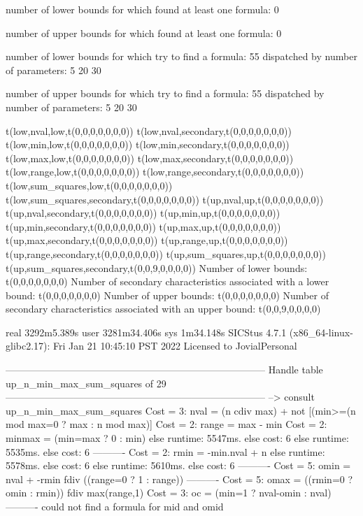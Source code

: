number of lower bounds for which found at least one formula: 0

number of upper bounds for which found at least one formula: 0

number of lower bounds for which try to find a formula: 55
dispatched by number of parameters: 5  20  30

number of upper bounds for which try to find a formula: 55
dispatched by number of parameters: 5  20  30

t(low,nval,low,t(0,0,0,0,0,0,0))
t(low,nval,secondary,t(0,0,0,0,0,0,0))
t(low,min,low,t(0,0,0,0,0,0,0))
t(low,min,secondary,t(0,0,0,0,0,0,0))
t(low,max,low,t(0,0,0,0,0,0,0))
t(low,max,secondary,t(0,0,0,0,0,0,0))
t(low,range,low,t(0,0,0,0,0,0,0))
t(low,range,secondary,t(0,0,0,0,0,0,0))
t(low,sum_squares,low,t(0,0,0,0,0,0,0))
t(low,sum_squares,secondary,t(0,0,0,0,0,0,0))
t(up,nval,up,t(0,0,0,0,0,0,0))
t(up,nval,secondary,t(0,0,0,0,0,0,0))
t(up,min,up,t(0,0,0,0,0,0,0))
t(up,min,secondary,t(0,0,0,0,0,0,0))
t(up,max,up,t(0,0,0,0,0,0,0))
t(up,max,secondary,t(0,0,0,0,0,0,0))
t(up,range,up,t(0,0,0,0,0,0,0))
t(up,range,secondary,t(0,0,0,0,0,0,0))
t(up,sum_squares,up,t(0,0,0,0,0,0,0))
t(up,sum_squares,secondary,t(0,0,9,0,0,0,0))
Number of lower bounds:                                             t(0,0,0,0,0,0,0)
Number of secondary characteristics associated with a lower bound:  t(0,0,0,0,0,0,0)
Number of upper bounds:                                             t(0,0,0,0,0,0,0)
Number of secondary characteristics associated with an upper bound: t(0,0,9,0,0,0,0)

real	3292m5.389s
user	3281m34.406s
sys	1m34.148s
SICStus 4.7.1 (x86_64-linux-glibc2.17): Fri Jan 21 10:45:10 PST 2022
Licensed to JovialPersonal


--------------------------------------------------------------------------------
Handle table up_n_min_max_sum_squares of 29
--------------------------------------------------------------------------------
--> consult up_n_min_max_sum_squares
Cost =  3:  nval   = (n cdiv max) + not [(min>=(n mod max=0 ? max : n mod max)] %
Cost =  2:  range  = max - min
Cost =  2:  minmax = (min=max ? 0 : min)
else runtime: 5547ms. else cost: 6
else runtime: 5535ms. else cost: 6
----------
Cost =  2:  rmin   = -min.nval + n
else runtime: 5578ms. else cost: 6
else runtime: 5610ms. else cost: 6
----------
Cost =  5:  omin   = nval + -rmin fdiv ((range=0 ? 1 : range)) %
----------
Cost =  5:  omax   = ((rmin=0 ? omin : rmin)) fdiv max(range,1) %
Cost =  3:  oc     = (min=1 ? nval-omin : nval)
----------
could not find a formula for mid and omid

